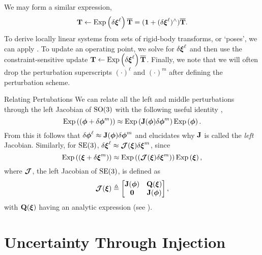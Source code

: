 We may form a similar expression,
\begin{equation}
	\label{eq:math_se3_perturbations}
	\boldsymbol{\mathbf{T}} \leftarrow \mathrm{Exp}\left({\delta \boldsymbol{\mathbf{\xi}}^\ell}\right) \overline{\boldsymbol{\mathbf{T}}} = (\boldsymbol{\mathbf{1}} + (\delta \boldsymbol{\mathbf{\xi}}^\ell)^\wedge) \overline{\boldsymbol{\mathbf{T}}}.
\end{equation}
To derive locally linear systems from sets of rigid-body transforms, or `poses', we can apply . To update an operating point, we solve for $\delta \boldsymbol{\mathbf{\xi}}^\ell$ and then use the constraint-sensitive update $\boldsymbol{\mathbf{T}} \leftarrow \mathrm{Exp}\left({\delta \boldsymbol{\mathbf{\xi}}^\ell}\right) \overline{\boldsymbol{\mathbf{T}}}$. Finally, we note that we will often drop the perturbation superscripts $(\cdot)^\ell$ and $(\cdot)^m$ after defining the perturbation scheme.

\begin{remark}{Relating Pertubations}
	We can relate all the left and middle perturbations through the left Jacobian of $\mathrm{SO}(3)$ with the following useful identity \citep{Barfoot2017-ri},
\begin{equation}
\mathrm{Exp}\left({( \boldsymbol{\mathbf{\phi}} + \delta \boldsymbol{\mathbf{\phi}}^m)}\right) \approx \mathrm{Exp}\left({\boldsymbol{\mathbf{J}}(\boldsymbol{\mathbf{\phi}}) \delta \boldsymbol{\mathbf{\phi}}^m}\right) \mathrm{Exp}\left({\boldsymbol{\mathbf{\phi}}}\right).	
\end{equation}
From this it follows that $\delta \boldsymbol{\mathbf{\phi}}^\ell \approx \boldsymbol{\mathbf{J}}(\boldsymbol{\mathbf{\phi}}) \delta \boldsymbol{\mathbf{\phi}}^m$ and elucidates why $\boldsymbol{\mathbf{J}}$ is called the \textit{left} Jacobian. Similarly, for $\mathrm{SE}(3)$, $\delta \boldsymbol{\mathbf{\xi}}^\ell \approx \boldsymbol{\mathbf{\mathcal{J}}}(\boldsymbol{\mathbf{\xi}}) \delta \boldsymbol{\mathbf{\xi}}^m$, since
\begin{equation}
\mathrm{Exp}\left({( \boldsymbol{\mathbf{\xi}} + \delta \boldsymbol{\mathbf{\xi}}^m)}\right) \approx \mathrm{Exp}\left({(\boldsymbol{\mathbf{\mathcal{J}}}(\boldsymbol{\mathbf{\xi}}) \delta \boldsymbol{\mathbf{\xi}}^m)}\right) \mathrm{Exp}\left({\boldsymbol{\mathbf{\xi}}}\right),
\end{equation}
where $\boldsymbol{\mathbf{\mathcal{J}}}$, the left Jacobian of $\mathrm{SE}(3)$, is defined as
\begin{equation}
\boldsymbol{\mathbf{\mathcal{J}}} (\boldsymbol{\mathbf{\xi}}) \triangleq \begin{bmatrix}  \boldsymbol{\mathbf{J}}(\boldsymbol{\mathbf{\phi}}) & \boldsymbol{\mathbf{Q}}(\boldsymbol{\mathbf{\xi}}) \\ \boldsymbol{\mathbf{0}} & \boldsymbol{\mathbf{J}}(\boldsymbol{\mathbf{\phi}}) \end{bmatrix},
\end{equation}
with $\boldsymbol{\mathbf{Q}}(\boldsymbol{\mathbf{\xi}})$ having an analytic expression (see \cite{Barfoot2017-ri}).
\end{remark}

\section{Uncertainty Through Injection}

